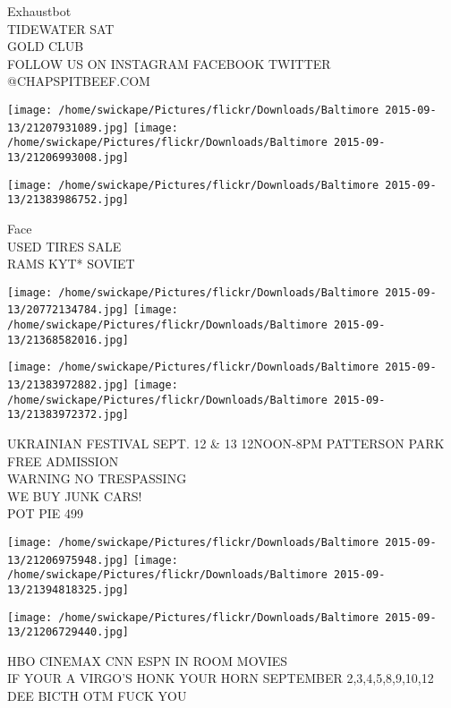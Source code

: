 \documentclass[10pt,letterpaper]{article}
\begin{document}
Exhaustbot\\
TIDEWATER SAT\\
GOLD CLUB\\
FOLLOW US ON INSTAGRAM FACEBOOK TWITTER @CHAPSPITBEEF.COM\\
\pagebreak

\texttt{[image: /home/swickape/Pictures/flickr/Downloads/Baltimore 2015-09-13/21207931089.jpg]}
\texttt{[image: /home/swickape/Pictures/flickr/Downloads/Baltimore 2015-09-13/21206993008.jpg]}

\vspace{0.25in}
\texttt{[image: /home/swickape/Pictures/flickr/Downloads/Baltimore 2015-09-13/21383986752.jpg]}

Face\\
USED TIRES SALE\\
RAMS KYT* SOVIET\\
\pagebreak

\texttt{[image: /home/swickape/Pictures/flickr/Downloads/Baltimore 2015-09-13/20772134784.jpg]}
\texttt{[image: /home/swickape/Pictures/flickr/Downloads/Baltimore 2015-09-13/21368582016.jpg]}

\texttt{[image: /home/swickape/Pictures/flickr/Downloads/Baltimore 2015-09-13/21383972882.jpg]}
\texttt{[image: /home/swickape/Pictures/flickr/Downloads/Baltimore 2015-09-13/21383972372.jpg]}

UKRAINIAN FESTIVAL SEPT. 12 \& 13 12NOON{-}8PM PATTERSON PARK FREE ADMISSION\\
WARNING NO TRESPASSING\\
WE BUY JUNK CARS!\\
POT PIE 499\\
\pagebreak

\texttt{[image: /home/swickape/Pictures/flickr/Downloads/Baltimore 2015-09-13/21206975948.jpg]}
\texttt{[image: /home/swickape/Pictures/flickr/Downloads/Baltimore 2015-09-13/21394818325.jpg]}

\vspace{0.25in}
\texttt{[image: /home/swickape/Pictures/flickr/Downloads/Baltimore 2015-09-13/21206729440.jpg]}

HBO CINEMAX CNN ESPN IN ROOM MOVIES\\
IF YOUR A VIRGO'S HONK YOUR HORN SEPTEMBER 2,3,4,5,8,9,10,12\\
DEE BICTH OTM FUCK YOU\\
\pagebreak
\end{document}
